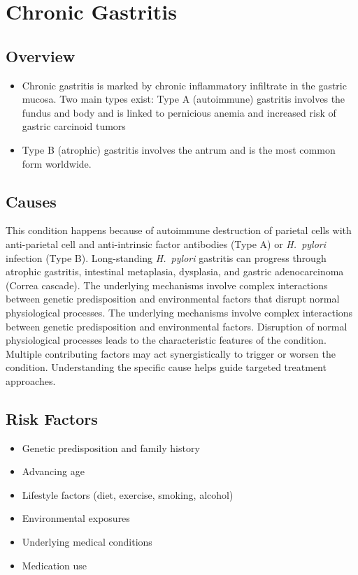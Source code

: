 \chapter{Chronic Gastritis}
\label{sec:Chronic Gastritis}

\section{Overview}


\begin{itemize}[noitemsep]
  \item Chronic gastritis is marked by chronic inflammatory infiltrate in the gastric mucosa. Two main types exist: Type A (autoimmune) gastritis involves the fundus and body and is linked to pernicious anemia and increased risk of gastric carcinoid tumors
  \item Type B (atrophic) gastritis involves the antrum and is the most common form worldwide.
\end{itemize}
\section{Causes}
This condition happens because of autoimmune destruction of parietal cells with anti-parietal cell and anti-intrinsic factor antibodies (Type A) or \textit{H.~pylori} infection (Type B). Long-standing \textit{H.~pylori} gastritis can progress through atrophic gastritis, intestinal metaplasia, dysplasia, and gastric adenocarcinoma (Correa cascade). The underlying mechanisms involve complex interactions between genetic predisposition and environmental factors that disrupt normal physiological processes. The underlying mechanisms involve complex interactions between genetic predisposition and environmental factors. Disruption of normal physiological processes leads to the characteristic features of the condition. Multiple contributing factors may act synergistically to trigger or worsen the condition. Understanding the specific cause helps guide targeted treatment approaches.
\section{Risk Factors}


\begin{itemize}[noitemsep]
  \item Genetic predisposition and family history
  \item Advancing age
  \item Lifestyle factors (diet, exercise, smoking, alcohol)
  \item Environmental exposures
  \item Underlying medical conditions
  \item Medication use
\end{itemize}
